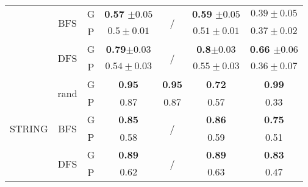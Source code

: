\begin{table}[h]
\begin{tabular}{ccccccc}
        & \multirow{2}{*}{BFS}   & G  &  \textbf{0.57} $\pm 0.05 $&   \multirow{2}{*}{/} &  \textbf{0.59} $\pm 0.05 $&  $0.39 \pm 0.05$ \\
        & & P & $0.5 \pm 0.01 $&    &  $0.51 \pm 0.01 $&  $0.37 \pm 0.02 $\\
        & \multirow{2}{*}{DFS}   & G  &  \textbf{0.79}$ \pm 0.03 $&   \multirow{2}{*}{/} &   \textbf{0.8}$ \pm 0.03$ &  \textbf{0.66} $\pm 0.06 $\\
        & & P & $0.54 \pm 0.03 $&  &  $0.55 \pm 0.03 $&  $0.36 \pm 0.07 $\\
        \midrule
        \multirow{6}{*}{STRING} & \multirow{2}{*}{rand} & G &   \textbf{0.95} &   \textbf{0.95} &  \textbf{0.72} &  \textbf{0.99}  \\
        & & P & 0.87 & 0.87 & 0.57 & 0.33 \\
        & \multirow{2}{*}{BFS}  & G   &  \textbf{0.85} &   \multirow{2}{*}{/} &  \textbf{0.86} &  \textbf{0.75} \\
        & & P & 0.58 & & 0.59 & 0.51 \\
        & \multirow{2}{*}{DFS}  & G   &  \textbf{0.89} &   \multirow{2}{*}{/} &   \textbf{0.89} &  \textbf{0.83}\\
        & & P & $0.62$ & & $0.63$ & $0.47$ \\
        \bottomrule
    \end{tabular}


\end{table}
